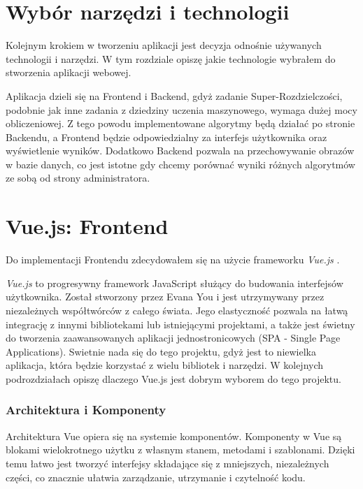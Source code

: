 \section{Wybór narzędzi i technologii}

Kolejnym krokiem w tworzeniu aplikacji jest decyzja odnośnie używanych technologii i narzędzi. W tym rozdziale opiszę jakie technologie wybrałem do stworzenia aplikacji webowej. 

Aplikacja dzieli się na Frontend i Backend, gdyż zadanie Super-Rozdzielczości, podobnie jak inne zadania z dziedziny uczenia maszynowego, wymaga dużej mocy obliczeniowej. Z tego powodu implementowane algorytmy będą działać po stronie Backendu, a Frontend będzie odpowiedzialny za interfejs użytkownika oraz wyświetlenie wyników.
Dodatkowo Backend pozwala na przechowywanie obrazów w bazie danych, co jest istotne gdy chcemy porównać wyniki różnych algorytmów ze sobą od strony administratora.

\newpage
\section{Vue.js: Frontend}

Do implementacji Frontendu zdecydowałem się na użycie frameworku \textit{Vue.js} \cite{vue}.


\textit{Vue.js} to progresywny framework JavaScript służący do budowania interfejsów użytkownika. Został stworzony przez Evana You i jest utrzymywany przez niezależnych współtwórców z całego świata. Jego elastyczność pozwala na łatwą integrację z innymi bibliotekami lub istniejącymi projektami, a także jest świetny do tworzenia zaawansowanych aplikacji jednostronicowych (SPA - Single Page Applications). Swietnie nada się do tego projektu, gdyż jest to niewielka aplikacja, która będzie korzystać z wielu bibliotek i narzędzi. W kolejnych podrozdziałach opiszę dlaczego Vue.js jest dobrym wyborem do tego projektu.


\subsubsection*{Architektura i Komponenty}

Architektura Vue opiera się na systemie komponentów. Komponenty w Vue są blokami wielokrotnego użytku z własnym stanem, metodami i szablonami. Dzięki temu łatwo jest tworzyć interfejsy składające się z mniejszych, niezależnych części, co znacznie ułatwia zarządzanie, utrzymanie i czytelność kodu.

